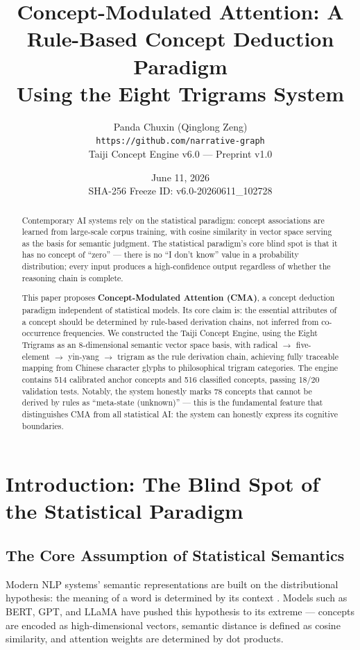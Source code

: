 \documentclass[11pt,a4paper]{article}
\title{Concept-Modulated Attention: A Rule-Based Concept Deduction Paradigm\\ Using the Eight Trigrams System}
\author{Panda Chuxin (Qinglong Zeng)\\
\texttt{https://github.com/narrative-graph}\\
\small Taiji Concept Engine v6.0 — Preprint v1.0}
\date{June 11, 2026\\
\small SHA-256 Freeze ID: v6.0-20260611\_102728}
\begin{document}
\maketitle

\begin{abstract}
Contemporary AI systems rely on the statistical paradigm: concept associations are learned from large-scale corpus training, with cosine similarity in vector space serving as the basis for semantic judgment. The statistical paradigm's core blind spot is that it has no concept of ``zero'' — there is no ``I don't know'' value in a probability distribution; every input produces a high-confidence output regardless of whether the reasoning chain is complete.

This paper proposes \textbf{Concept-Modulated Attention (CMA)}, a concept deduction paradigm independent of statistical models. Its core claim is: the essential attributes of a concept should be determined by rule-based derivation chains, not inferred from co-occurrence frequencies. We constructed the Taiji Concept Engine, using the Eight Trigrams as an 8-dimensional semantic vector space basis, with radical $\rightarrow$ five-element $\rightarrow$ yin-yang $\rightarrow$ trigram as the rule derivation chain, achieving fully traceable mapping from Chinese character glyphs to philosophical trigram categories. The engine contains 514 calibrated anchor concepts and 516 classified concepts, passing 18/20 validation tests. Notably, the system honestly marks 78 concepts that cannot be derived by rules as ``meta-state (unknown)'' — this is the fundamental feature that distinguishes CMA from all statistical AI: the system can honestly express its cognitive boundaries.
\end{abstract}

\section{Introduction: The Blind Spot of the Statistical Paradigm}

\subsection{The Core Assumption of Statistical Semantics}

Modern NLP systems' semantic representations are built on the distributional hypothesis: the meaning of a word is determined by its context \cite{firth1957, harris1954}. Models such as BERT, GPT, and LLaMA have pushed this hypothesis to its extreme — concepts are encoded as high-dimensional vectors, semantic distance is defined as cosine similarity, and attention weights are determined by dot products.
\end{document}
